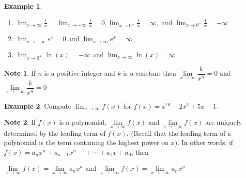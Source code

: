 \documentclass{article}
\theoremstyle{definition}
\newtheorem{ex}{Example}[subsection]
\newtheorem*{note}{Note}
\newcommand*{\dlim}{\displaystyle\lim}
\begin{document}
\begin{ex}
\begin{enumerate}
\item  $\dlim_{x\to\infty}\frac{1}{x}=\dlim_{x\to-\infty}\frac{1}{x}=0, \dlim_{x\to0^+}\frac{1}{x}=\infty, \text{  and  } \dlim_{x\to0^-}\frac{1}{x}=-\infty$
\vspace{1.5in}
\item $\dlim_{x\to-\infty}e^x=0 \text{  and  } \dlim_{x\to\infty}e^x=\infty$
\vspace{1.5in}
\item $\dlim_{x\to0^+}\ln(x)=-\infty \text{  and  } \dlim_{x\to\infty}\ln(x)=\infty$
\end{enumerate}
\vspace{1.5in}
\end{ex}

\begin{note}
If $n$ is a positive integer and $k$ is a constant then $\lim\limits_{x \to \infty} \dfrac{k}{x^n} = 0$ and $\lim\limits_{x \to -\infty} \dfrac{k}{x^n} = 0$
\end{note}


\begin{ex}
Compute $\dlim_{x\to\infty}f(x)$ for $f(x)=x^{10}-2x^3+5x-1$.
\end{ex}

\vspace{2in}

\begin{note} If $f(x)$ is a polynomial, $\lim\limits_{x \to \infty} f(x)$ and $\lim\limits_{x \to -\infty} f(x)$ are uniquely determined by the leading term of $f(x)$. (Recall that the leading term of a polynomial is the term containing the highest power on $x$). In other words, if $f(x) = a_n x^n + a_{n-1}x^{n-1} + \cdots + a_1 x + a_0$, then
\begin{center}
$\lim\limits_{x \to \infty} f(x) = \lim\limits_{x \to \infty} a_n x^n$ \hspace{.5cm} and \hspace{.5cm}  $\lim\limits_{x \to -\infty} f(x) = \lim\limits_{x \to -\infty} a_n x^n$
\end{center}
\end{note}
\end{document}
